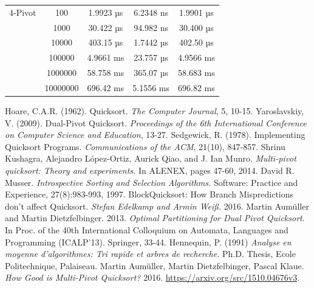 \documentclass{article}
\begin{document}
\begin{center}
\begin{tabular}{ |c c | c c c| }
        \hline
        4-Pivot         & 100      & 1.9923 µs    &	6.2348 ns   & 1.9901 µs \\
                        & 1000     & 30.422 µs    &	94.982 ns   & 30.400 µs \\
                        & 10000    & 403.15 µs    & 1.7442 µs   & 402.50 µs \\
                        & 100000   & 4.9661 ms    & 23.757 µs   & 4.9566 ms \\
                        & 1000000  & 58.758 ms    & 365.07 µs 	& 58.683 ms \\
                        & 10000000 & 696.42 ms    & 5.1556 ms   & 696.82 ms \\
        \hline
    \end{tabular}
\end{center}

\begin{thebibliography}{99}

 \label{HoareQuickSort} Hoare, C.A.R. (1962). Quicksort. \textit{The Computer Journal}, 5, 10-15.
 \label{Yaroslavskiy} Yaroslavskiy, V. (2009). Dual-Pivot Quicksort. \textit{Proceedings of the 6th International Conference on Computer Science and Education}, 13-27.
 \label{Sedgewick} Sedgewick, R. (1978). Implementing Quicksort Programs. \textit{Communications of the ACM}, 21(10), 847-857.
 \label{Kushagra} {Shrinu Kushagra, Alejandro López-Ortiz, Aurick Qiao, and J. Ian Munro. \textit{Multi-pivot quicksort: Theory and experiments.} In ALENEX, pages 47-60, 2014.}
 \label{Introsort} David R. Musser. \textit{Introspective Sorting and Selection Algorithms.} Software: Practice and Experience, 27(8):983-993, 1997.
 \label{BlockQuickSort} BlockQuicksort: How Branch Mispredictions don't affect Quicksort. \textit{Stefan Edelkamp and Armin Weiß.} 2016.
 \label{OptimalPartitioningForDualPivotQuicksort} Martin Aumüller and Martin Dietzfelbinger. 2013. \textit{Optimal Partitioning for Dual Pivot Quicksort}. In Proc.
of the 40th International Colloquium on Automata, Languages and Programming (ICALP'13). Springer, 33-44.
 \label{Hennequin} Hennequin, P. (1991) \textit{Analyse en moyenne d'algorithmes: Tri rapide et arbres de recherche.} Ph.D. Thesis, Ecole Politechnique, Palaiseau.
 \label{HowGoodIsMultiPivotQuicksort} Martin Aumüller, Martin Dietzfelbinger, Pascal Klaue. \textit{How Good is Multi-Pivot Quicksort?} 2016. \url{https://arxiv.org/src/1510.04676v3}.
\end{thebibliography}
\end{document}
